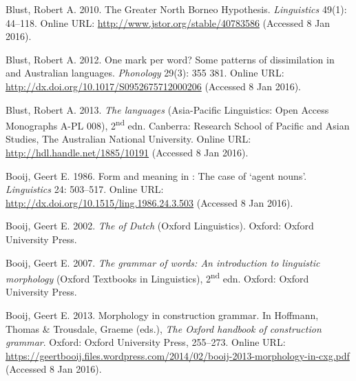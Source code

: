 \begin{styleCitaviBibliographyEntry}
Blust, Robert A. 2010. The Greater North Borneo Hypothesis. \textit{ Linguistics} 49(1): 44–118. Online URL: \url{http://www.jstor.org/stable/40783586} (Accessed 8 Jan 2016).
\end{styleCitaviBibliographyEntry}

\begin{styleCitaviBibliographyEntry}
Blust, Robert A. 2012. One mark per word? Some patterns of dissimilation in  and Australian languages. \textit{Phonology} 29(3): 355 381. Online URL: \url{http://dx.doi.org/10.1017/S0952675712000206} (Accessed 8 Jan 2016).
\end{styleCitaviBibliographyEntry}

\begin{styleCitaviBibliographyEntry}
Blust, Robert A. 2013. \textit{The  languages} (Asia-Pacific Linguistics: Open Access Monographs A-PL 008), 2\textsuperscript{nd} edn. Canberra: Research School of Pacific and Asian Studies, The Australian National University. Online URL: \url{http://hdl.handle.net/1885/10191} (Accessed 8 Jan 2016).
\end{styleCitaviBibliographyEntry}

\begin{styleCitaviBibliographyEntry}
Booij, Geert E. 1986. Form and meaning in : The case of  ‘agent nouns’. \textit{Linguistics} 24: 503–517. Online URL: \url{http://dx.doi.org/10.1515/ling.1986.24.3.503} (Accessed 8 Jan 2016).
\end{styleCitaviBibliographyEntry}

\begin{styleCitaviBibliographyEntry}
Booij, Geert E. 2002. \textit{The  of Dutch} (Oxford Linguistics). Oxford: Oxford University Press.
\end{styleCitaviBibliographyEntry}

\begin{styleCitaviBibliographyEntry}
Booij, Geert E. 2007. \textit{The grammar of words: An introduction to linguistic morphology} (Oxford Textbooks in Linguistics), 2\textsuperscript{nd} edn. Oxford: Oxford University Press.
\end{styleCitaviBibliographyEntry}

\begin{styleCitaviBibliographyEntry}
Booij, Geert E. 2013. Morphology in construction grammar. In Hoffmann, Thomas \& Trousdale, Graeme (eds.), \textit{The Oxford handbook of construction grammar}. Oxford: Oxford University Press, 255–273. Online URL: \url{https://geertbooij.files.wordpress.com/2014/02/booij-2013-morphology-in-cxg.pdf} (Accessed 8 Jan 2016).
\end{styleCitaviBibliographyEntry}

